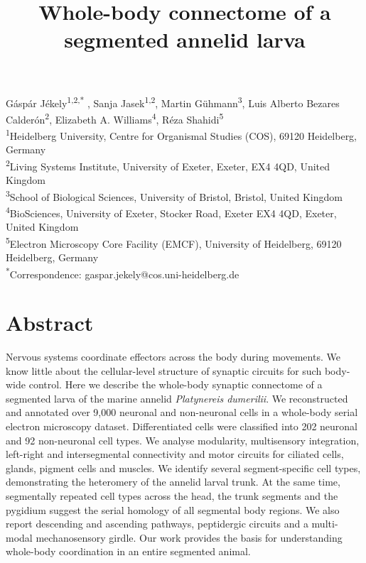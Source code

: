 \documentclass[
  11pt,
]{article}
\title{Whole-body connectome of a segmented annelid larva}
\author{}
\date{}
\begin{document}
\maketitle

\linenumbers

\hfill\break

Gáspár Jékely\textsuperscript{1,2,*} , Sanja Jasek\textsuperscript{1,2},
Martin Gühmann\textsuperscript{3}, Luis Alberto Bezares
Calderón\textsuperscript{2}, Elizabeth A. Williams\textsuperscript{4},
Réza Shahidi\textsuperscript{5}\\

\textsuperscript{1}Heidelberg University, Centre for Organismal Studies
(COS), 69120 Heidelberg, Germany\\
\textsuperscript{2}Living Systems Institute, University of Exeter,
Exeter, EX4 4QD, United Kingdom\\
\textsuperscript{3}School of Biological Sciences, University of Bristol,
Bristol, United Kingdom\\
\textsuperscript{4}BioSciences, University of Exeter, Stocker Road,
Exeter EX4 4QD, Exeter, United Kingdom\\
\textsuperscript{5}Electron Microscopy Core Facility (EMCF), University
of Heidelberg, 69120 Heidelberg, Germany\\
\textsuperscript{*}Correspondence: gaspar.jekely@cos.uni-heidelberg.de

\section{Abstract}\label{abstract}

Nervous systems coordinate effectors across the body during movements.
We know little about the cellular-level structure of synaptic circuits
for such body-wide control. Here we describe the whole-body synaptic
connectome of a segmented larva of the marine annelid \emph{Platynereis
dumerilii}. We reconstructed and annotated over 9,000 neuronal and
non-neuronal cells in a whole-body serial electron microscopy dataset.
Differentiated cells were classified into 202 neuronal and 92
non-neuronal cell types. We analyse modularity, multisensory
integration, left-right and intersegmental connectivity and motor
circuits for ciliated cells, glands, pigment cells and muscles. We
identify several segment-specific cell types, demonstrating the
heteromery of the annelid larval trunk. At the same time, segmentally
repeated cell types across the head, the trunk segments and the pygidium
suggest the serial homology of all segmental body regions. We also
report descending and ascending pathways, peptidergic circuits and a
multi-modal mechanosensory girdle. Our work provides the basis for
understanding whole-body coordination in an entire segmented animal.
\end{document}
